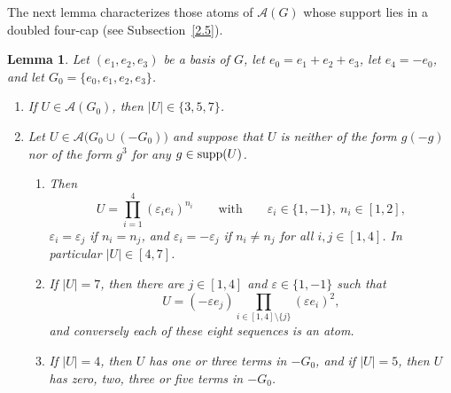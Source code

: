 \documentclass[a4paper, 10pt]{amsart}
\theoremstyle{plain}
\newtheorem{lemma}[theorem]{\bf Lemma}
\theoremstyle{definition}
\theoremstyle{definition}
\numberwithin{equation}{section}
\begin{document}
The next lemma characterizes those atoms of $\mathcal A (G)$ whose support lies in a  doubled four-cap (see Subsection~\ref{2.5}).

\begin{lemma}\label{lem:cap-atoms}
Let $(e_1,e_2,e_3)$ be a basis of $G$, let $e_0 = e_1+e_2+e_3$, let
$e_4 = -e_0$, and let $G_0 = \{e_0,e_1,e_2,e_3\}$.
\begin{enumerate}
\item If $U \in \mathcal A (G_0)$, then $|U| \in \{3,5,7\}$.

\item Let $U \in \mathcal A \big(  G_0 \cup (-G_0) \big)$ and suppose that $U$ is
      neither of the form $g(-g)$ nor of the form $g^3$ for any $g \in \operatorname{supp} (U)$.
      \begin{enumerate}
      \item Then
            \[
            U = \prod_{i=1}^{4}(\varepsilon_i e_i)^{n_i}
            \qquad \text{with} \qquad \varepsilon_i \in \{1,-1\}, \ n_i \in [1,2] ,
            \]
            $\varepsilon_i = \varepsilon_j$ if $n_i = n_j$, and $\varepsilon_i = -\varepsilon_j$ if $n_i \ne n_j$ for all $i,j \in [1,4]$.  In particular $|U| \in [4,7]$.
      
      \item If $|U| = 7$, then there are $j \in [1,4]$ and
            $\varepsilon \in \{1,-1\}$ such that
            \[
            U =  (-\varepsilon e_j)  \prod_{i \in [1,4] \setminus \{ j\}}(\varepsilon e_i)^2 ,
            \]
            and conversely each of these eight sequences is an atom.
            
      \item If $|U| = 4$, then $U$ has one or three terms in $-G_0$, and if $|U| = 5$, then $U$ has zero, two, three or five terms in $-G_0$.
      \end{enumerate}      
\end{enumerate}
\end{lemma}
\end{document}
